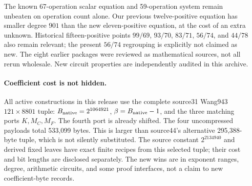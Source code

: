 The known 67-operation scalar equation and 59-operation system remain
unbeaten on operation count alone. Our previous twelve-positive equation
has smaller degree $901$ than the new eleven-positive equation, at the
cost of an extra unknown. Historical fifteen-positive points $99/69$,
$93/70$, $83/71$, $56/74$, and $44/78$ also remain relevant; the present
$56/74$ regrouping is explicitly not claimed as new. The eight earlier
packages were reviewed as mathematical sources, not all rerun wholesale.
New circuit properties are independently audited in this archive.

\paragraph{Coefficient cost is not hidden.}
All active constructions in this release use the complete source31
Wang943 $121\times8801$ tuple: $B_{\rm native}=2^{1064921}$,
$\beta=B_{\rm native}-1$, and the three matching ports $K,M_C,M_F$.
The fourth port is already shifted. The four uncompressed payloads total
533,099 bytes. This is larger than source44's alternative 295,388-byte
tuple, which is not silently substituted. The source constant
$2^{2134940}$ and derived fixed leaves have exact finite recipes from this
selected tuple; their cost and bit lengths are disclosed separately.
The new wins are in exponent ranges, degree, arithmetic circuits, and
some proof interfaces, not a claim to new coefficient-byte records.
